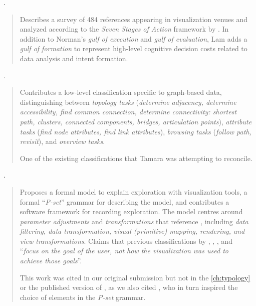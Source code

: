 \begin{sloppypar}
~\cite{Lam2008}. \end{sloppypar}

\begin{quotation}
    Describes a survey of 484 references appearing in visualization venues and analyzed according to the {\it Seven Stages of Action} framework by \citet{Norman1988}. 
    In addition to Norman's {\it gulf of execution} and {\it gulf of evaluation}, Lam adds a {\it gulf of formation} to represent high-level cognitive decision costs related to data analysis and intent formation.
\end{quotation}

\begin{sloppypar}
~\cite{Lee2006}. \end{sloppypar}

\begin{quotation}
    \begin{sloppypar}
    Contributes a low-level classification specific to graph-based data, distinguishing between {\it topology tasks} ({\it determine adjacency, determine accessibility, find common connection, determine connectivity: shortest path, clusters, connected components, bridges, articulation points}), {\it attribute tasks} ({\it find node attributes, find link attributes}), {\it browsing tasks} ({\it follow path, revisit}), and {\it overview tasks}.
    \end{sloppypar}
    
    One of the existing classifications that Tamara was attempting to reconcile.
\end{quotation}

\begin{sloppypar}
~\cite{Jankun-Kelly2007}. \end{sloppypar}

\begin{quotation}
    Proposes a formal model to explain exploration with visualization tools, a formal ``{\it P-set}'' grammar for describing the model, and contributes a software framework for recording exploration. 
    The model centres around {\it parameter adjustments} and {\it transformations} that reference \citet{Card1999}, including {\it data filtering, data transformation, visual (primitive) mapping, rendering, and view transformations}.
    Claims that previous classifications by \citet{Chi1998}, \cite{Chuah1996}, \citet{Shneiderman1996}, and \citet{Wehrend1990} ``{\it focus on the goal of the user, not how the visualization was used to achieve those goals}''.

    This work was cited in our original submission but not in the  \autoref{ch:typology} or the published version of \citet{Brehmer2013}, as we also cited \citet{Card1999}, who in turn inspired the choice of elements in the {\it P-set} grammar.
\end{quotation}


